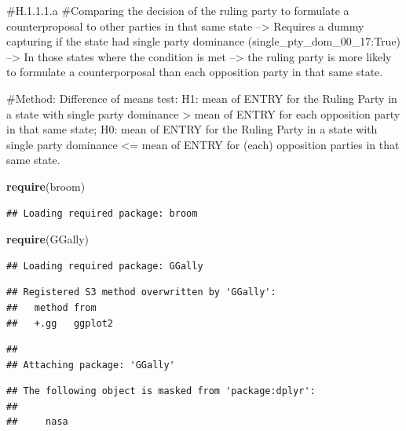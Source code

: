 \documentclass[
]{article}
\newenvironment{Shaded}{\begin{snugshade}}{\end{snugshade}}
\newcommand{\DataTypeTok}[1]{\textcolor[rgb]{0.13,0.29,0.53}{#1}}
\newcommand{\KeywordTok}[1]{\textcolor[rgb]{0.13,0.29,0.53}{\textbf{#1}}}
\newcommand{\NormalTok}[1]{#1}
\newcommand{\OperatorTok}[1]{\textcolor[rgb]{0.81,0.36,0.00}{\textbf{#1}}}
\newcommand{\StringTok}[1]{\textcolor[rgb]{0.31,0.60,0.02}{#1}}
\begin{document}
\#H.1.1.1.a \#Comparing the decision of the ruling party to formulate a
counterproposal to other parties in that same state --\textgreater{}
Requires a dummy capturing if the state had single party dominance
(single\_pty\_dom\_00\_17:True) --\textgreater{} In those states where
the condition is met --\textgreater{} the ruling party is more likely to
formulate a counterporposal than each opposition party in that same
state.

\#Method: Difference of means test: H1: mean of ENTRY for the Ruling
Party in a state with single party dominance \textgreater{} mean of
ENTRY for each opposition party in that same state; H0: mean of ENTRY
for the Ruling Party in a state with single party dominance \textless=
mean of ENTRY for (each) opposition parties in that same state.

\begin{Shaded}
\begin{Highlighting}[]
\KeywordTok{require}\NormalTok{(broom)}
\end{Highlighting}
\end{Shaded}

\begin{verbatim}
## Loading required package: broom
\end{verbatim}

\begin{Shaded}
\begin{Highlighting}[]
\KeywordTok{require}\NormalTok{(GGally)}
\end{Highlighting}
\end{Shaded}

\begin{verbatim}
## Loading required package: GGally
\end{verbatim}

\begin{verbatim}
## Registered S3 method overwritten by 'GGally':
##   method from   
##   +.gg   ggplot2
\end{verbatim}

\begin{verbatim}
## 
## Attaching package: 'GGally'
\end{verbatim}

\begin{verbatim}
## The following object is masked from 'package:dplyr':
## 
##     nasa
\end{verbatim}

\begin{Shaded}
\end{Shaded}
\end{document}
